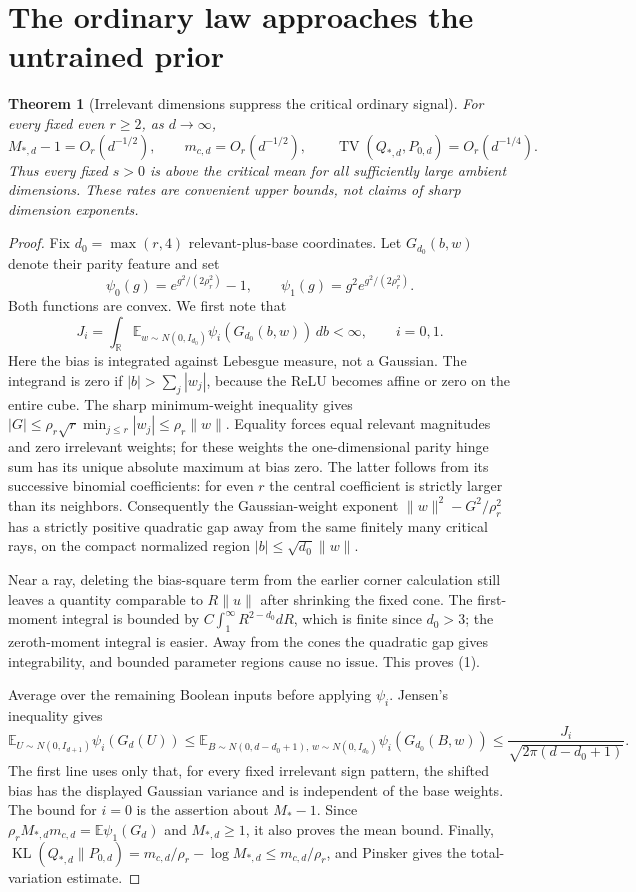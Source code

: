 \documentclass[11pt]{article}
\newtheorem{theorem}{Theorem}\newtheorem{lemma}[theorem]{Lemma}
\newcommand{\E}{\mathbb E}\newcommand{\R}{\mathbb R}
\begin{document}
\section{The ordinary law approaches the untrained prior}
\begin{theorem}[Irrelevant dimensions suppress the critical ordinary signal]
For every fixed even $r\ge2$, as $d\to\infty$,
\[
 M_{*,d}-1=O_r(d^{-1/2}),\qquad m_{c,d}=O_r(d^{-1/2}),\qquad
 \operatorname{TV}(Q_{*,d},P_{0,d})=O_r(d^{-1/4}).
\]
Thus every fixed $s>0$ is above the critical mean for all sufficiently
large ambient dimensions. These rates are convenient upper bounds,
not claims of sharp dimension exponents.
\end{theorem}
\begin{proof}
Fix $d_0=\max(r,4)$ relevant-plus-base coordinates. Let
$G_{d_0}(b,w)$ denote their parity feature and set
\[
 \psi_0(g)=e^{g^2/(2\rho_r^2)}-1,\qquad
 \psi_1(g)=g^2e^{g^2/(2\rho_r^2)}.
\]
Both functions are convex. We first note that
\[
 J_i=\int_{\R}\E_{w\sim N(0,I_{d_0})}
                  \psi_i(G_{d_0}(b,w))\,db<\infty,
 \qquad i=0,1.\tag{1}
\]
Here the bias is integrated against Lebesgue measure, not a Gaussian.
The integrand is zero if $|b|>\sum_j|w_j|$, because the ReLU becomes
affine or zero on the entire cube. The sharp minimum-weight inequality
gives $|G|\le\rho_r\sqrt r\min_{j\le r}|w_j|\le\rho_r\|w\|$.
Equality forces equal relevant magnitudes and zero irrelevant weights;
for these weights the one-dimensional parity hinge sum has its unique
absolute maximum at bias zero. The latter follows from its successive
binomial coefficients: for even $r$ the central coefficient is strictly
larger than its neighbors. Consequently the Gaussian-weight exponent
$\|w\|^2-G^2/\rho_r^2$ has a strictly positive quadratic gap away
from the same finitely many critical rays, on the compact normalized
region $|b|\le\sqrt{d_0}\|w\|$.

Near a ray, deleting the bias-square term from the earlier corner
calculation still leaves a quantity comparable to $R\|u\|$ after
shrinking the fixed cone. The first-moment integral is bounded by
$C\int_1^\infty R^{2-d_0}dR$, which is finite since $d_0>3$;
the zeroth-moment integral is easier. Away from the cones the quadratic
gap gives integrability, and bounded parameter regions cause no issue.
This proves (1).

Average over the remaining Boolean inputs before applying $\psi_i$.
Jensen's inequality gives
\[
 \E_{U\sim N(0,I_{d+1})}\psi_i(G_d(U))
 \le \E_{B\sim N(0,d-d_0+1),\,w\sim N(0,I_{d_0})}
                       \psi_i(G_{d_0}(B,w))
 \le\frac{J_i}{\sqrt{2\pi(d-d_0+1)}}.
\]
The first line uses only that, for every fixed irrelevant sign pattern,
the shifted bias has the displayed Gaussian variance and is independent
of the base weights. The bound for $i=0$ is the assertion about $M_*-1$.
Since $\rho_rM_{*,d}m_{c,d}=\E\psi_1(G_d)$ and $M_{*,d}\ge1$,
it also proves the mean bound. Finally,
$\operatorname{KL}(Q_{*,d}\|P_{0,d})=m_{c,d}/\rho_r-\log M_{*,d}
\le m_{c,d}/\rho_r$, and Pinsker gives the total-variation estimate.
\end{proof}
\end{document}
